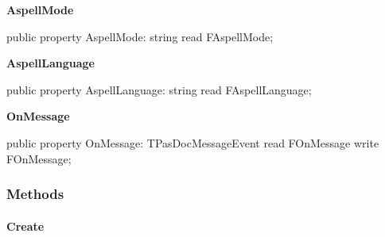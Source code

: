 \documentclass{report}
\newif\ifpdf
\begin{document}
\begin{list}{}{
\setlength{\itemindent}{0cm}
\setlength{\listparindent}{0cm}
\setlength{\leftmargin}{\evensidemargin}
\addtolength{\leftmargin}{\tmplength}
\settowidth{\labelsep}{X}
\addtolength{\leftmargin}{\labelsep}
\setlength{\labelwidth}{\tmplength}
}
\label{PasDoc_Aspell.TAspellProcess-AspellMode}
\item[\textbf{AspellMode}\hfill]
\ifpdf
\begin{flushleft}
\fi
\begin{ttfamily}
public property AspellMode: string read FAspellMode;\end{ttfamily}

\ifpdf
\end{flushleft}
\fi


\par  \label{PasDoc_Aspell.TAspellProcess-AspellLanguage}
\item[\textbf{AspellLanguage}\hfill]
\ifpdf
\begin{flushleft}
\fi
\begin{ttfamily}
public property AspellLanguage: string read FAspellLanguage;\end{ttfamily}

\ifpdf
\end{flushleft}
\fi


\par  \label{PasDoc_Aspell.TAspellProcess-OnMessage}
\item[\textbf{OnMessage}\hfill]
\ifpdf
\begin{flushleft}
\fi
\begin{ttfamily}
public property OnMessage: TPasDocMessageEvent read FOnMessage write FOnMessage;\end{ttfamily}

\ifpdf
\end{flushleft}
\fi


\par  \end{list}
\subsubsection*{\large{\textbf{Methods}}\normalsize\hspace{1ex}\hfill}
\paragraph*{Create}\hspace*{\fill}
\end{document}
